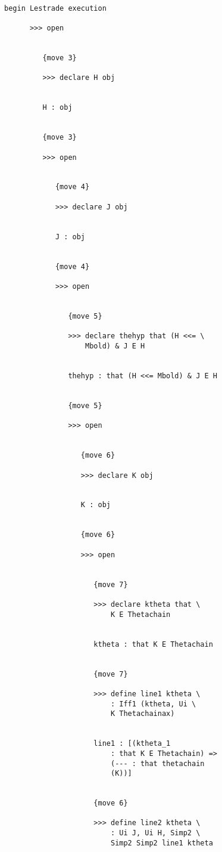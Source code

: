 \documentclass[12pt]{article}
\begin{document}
\begin{verbatim}

begin Lestrade execution

      >>> open


         {move 3}

         >>> declare H obj


         H : obj


         {move 3}

         >>> open


            {move 4}

            >>> declare J obj


            J : obj


            {move 4}

            >>> open


               {move 5}

               >>> declare thehyp that (H <<= \
                   Mbold) & J E H


               thehyp : that (H <<= Mbold) & J E H


               {move 5}

               >>> open


                  {move 6}

                  >>> declare K obj


                  K : obj


                  {move 6}

                  >>> open


                     {move 7}

                     >>> declare ktheta that \
                         K E Thetachain


                     ktheta : that K E Thetachain


                     {move 7}

                     >>> define line1 ktheta \
                         : Iff1 (ktheta, Ui \
                         K Thetachainax)


                     line1 : [(ktheta_1 
                         : that K E Thetachain) => 
                         (--- : that thetachain 
                         (K))]


                     {move 6}

                     >>> define line2 ktheta \
                         : Ui J, Ui H, Simp2 \
                         Simp2 Simp2 line1 ktheta



\end{verbatim}
\end{document}
